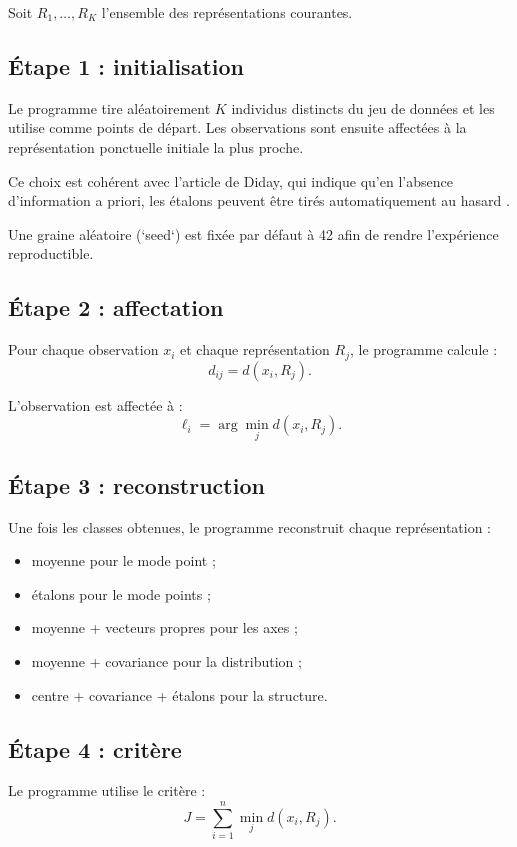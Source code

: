 \documentclass[12pt,a4paper]{article}
\begin{document}
Soit $R_1,\ldots,R_K$ l'ensemble des représentations courantes.

\subsection{Étape 1 : initialisation}

Le programme tire aléatoirement $K$ individus distincts du jeu de données et les utilise comme points de départ. Les observations sont ensuite affectées à la représentation ponctuelle initiale la plus proche.

Ce choix est cohérent avec l'article de Diday, qui indique qu'en l'absence d'information a priori, les étalons peuvent être tirés automatiquement au hasard \cite[p.~23]{diday1971}.

Une graine aléatoire (`seed`) est fixée par défaut à 42 afin de rendre l'expérience reproductible.

\subsection{Étape 2 : affectation}

Pour chaque observation $x_i$ et chaque représentation $R_j$, le programme calcule :
\[
d_{ij}=d(x_i,R_j).
\]

L'observation est affectée à :
\[
\ell_i=\arg\min_j d(x_i,R_j).
\]

\subsection{Étape 3 : reconstruction}

Une fois les classes obtenues, le programme reconstruit chaque représentation :
\begin{itemize}
    \item moyenne pour le mode point ;
    \item étalons pour le mode points ;
    \item moyenne + vecteurs propres pour les axes ;
    \item moyenne + covariance pour la distribution ;
    \item centre + covariance + étalons pour la structure.
\end{itemize}

\subsection{Étape 4 : critère}

Le programme utilise le critère :
\[
J=\sum_{i=1}^{n}\min_j d(x_i,R_j).
\]
\end{document}
